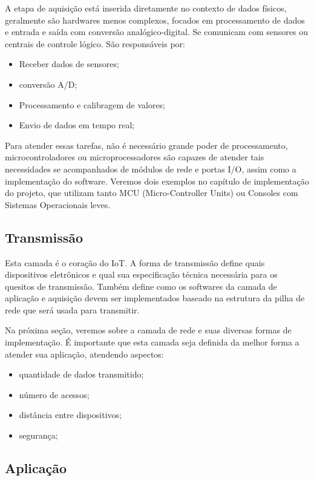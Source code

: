 A etapa de aquisição está inserida diretamente no contexto de dados físicos, geralmente são hardwares menos complexos, focados em processamento de dados e entrada e saída com conversão analógico-digital. Se comunicam com sensores ou centrais de controle lógico. São responsáveis por:

\begin{itemize}
	\item Receber dados de sensores;
	\item conversão A/D;
	\item Processamento e calibragem de valores;
	\item Envio de dados em tempo real;
\end{itemize} 

Para atender essas tarefas, não é necessário grande poder de processamento, microcontroladores ou microprocessadores são capazes de atender tais necessidades se acompanhados de módulos de rede e portas I/O, assim como a implementação do software. Veremos dois exemplos no capítulo de implementação do projeto, que utilizam tanto MCU (Micro-Controller Units) ou Consoles com Sistemas Operacionais leves.
 

\subsection{Transmissão}
\label{subsection:transmicao}

Esta camada é o coração do IoT. A forma de transmissão define quais dispositivos eletrônicos e qual sua especificação técnica necessária para os quesitos de transmissão. Também define como os softwares da camada de aplicação e aquisição devem ser implementados baseado na estrutura da pilha de rede que será usada para transmitir.

Na próxima seção, veremos sobre a camada de rede e suas diversas formas de implementação. É importante que esta camada seja definida da melhor forma a atender sua aplicação, atendendo aspectos: 
\begin{itemize}
\item quantidade de dados transmitido;
\item número de acessos; 
\item distância entre dispositivos;
\item segurança;
\end{itemize}

\subsection{Aplicação}
\label{subsection:aplicacao}

